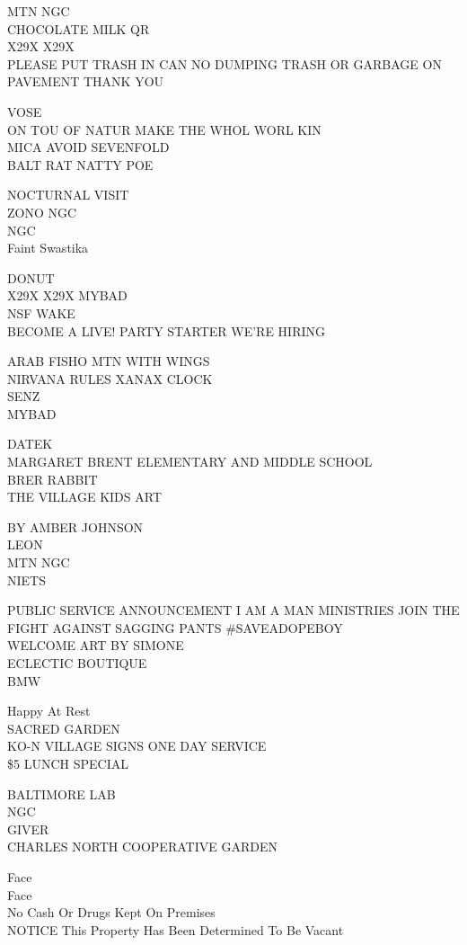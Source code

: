 \documentclass[10pt,letterpaper]{article}
\begin{document}
MTN NGC\\
CHOCOLATE MILK QR\\
X29X X29X\\
PLEASE PUT TRASH IN CAN NO DUMPING TRASH OR GARBAGE ON PAVEMENT THANK YOU

VOSE\\
ON TOU OF NATUR MAKE THE WHOL WORL KIN\\
MICA AVOID SEVENFOLD\\
BALT RAT NATTY POE

NOCTURNAL VISIT\\
ZONO NGC\\
NGC\\
Faint Swastika

DONUT\\
X29X X29X MYBAD\\
NSF WAKE\\
BECOME A LIVE! PARTY STARTER WE'RE HIRING

ARAB FISHO MTN WITH WINGS\\
NIRVANA RULES XANAX CLOCK\\
SENZ\\
MYBAD

DATEK\\
MARGARET BRENT ELEMENTARY AND MIDDLE SCHOOL\\
BRER RABBIT\\
THE VILLAGE KIDS ART

BY AMBER JOHNSON\\
LEON\\
MTN NGC\\
NIETS

PUBLIC SERVICE ANNOUNCEMENT I AM A MAN MINISTRIES JOIN THE FIGHT AGAINST SAGGING PANTS \#SAVEADOPEBOY\\
WELCOME ART BY SIMONE\\
ECLECTIC BOUTIQUE\\
BMW

Happy At Rest\\
SACRED GARDEN\\
KO{-}N VILLAGE SIGNS ONE DAY SERVICE\\
\$5 LUNCH SPECIAL

BALTIMORE LAB\\
NGC\\
GIVER\\
CHARLES NORTH COOPERATIVE GARDEN

Face\\
Face\\
No Cash Or Drugs Kept On Premises\\
NOTICE This Property Has Been Determined To Be Vacant
\end{document}
